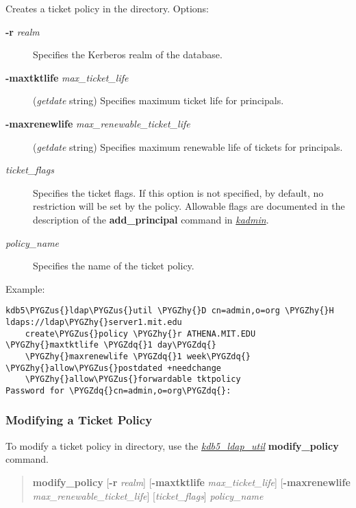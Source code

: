 \documentclass[letterpaper,10pt,english]{sphinxmanual}
\def\PYGZus{\char`\_}
\def\PYGZhy{\char`\-}
\def\PYGZdq{\char`\"}
\begin{document}
Creates a ticket policy in the directory.  Options:
\begin{description}
\item[{\textbf{-r} \emph{realm}}] \leavevmode
Specifies the Kerberos realm of the database.

\item[{\textbf{-maxtktlife} \emph{max\_ticket\_life}}] \leavevmode
(\emph{getdate} string) Specifies maximum ticket life for
principals.

\item[{\textbf{-maxrenewlife} \emph{max\_renewable\_ticket\_life}}] \leavevmode
(\emph{getdate} string) Specifies maximum renewable life of
tickets for principals.

\item[{\emph{ticket\_flags}}] \leavevmode
Specifies the ticket flags.  If this option is not specified, by
default, no restriction will be set by the policy.  Allowable
flags are documented in the description of the \textbf{add\_principal}
command in {\hyperref[admin/admin_commands/kadmin_local:kadmin-1]{\emph{kadmin}}}.

\item[{\emph{policy\_name}}] \leavevmode
Specifies the name of the ticket policy.

\end{description}

Example:

\begin{Verbatim}[commandchars=\\\{\}]
kdb5\PYGZus{}ldap\PYGZus{}util \PYGZhy{}D cn=admin,o=org \PYGZhy{}H ldaps://ldap\PYGZhy{}server1.mit.edu
    create\PYGZus{}policy \PYGZhy{}r ATHENA.MIT.EDU \PYGZhy{}maxtktlife \PYGZdq{}1 day\PYGZdq{}
    \PYGZhy{}maxrenewlife \PYGZdq{}1 week\PYGZdq{} \PYGZhy{}allow\PYGZus{}postdated +needchange
    \PYGZhy{}allow\PYGZus{}forwardable tktpolicy
Password for \PYGZdq{}cn=admin,o=org\PYGZdq{}:
\end{Verbatim}


\subsubsection{Modifying a Ticket Policy}
\label{admin/database:modifying-a-ticket-policy}
To modify a ticket policy in directory, use the
{\hyperref[admin/admin_commands/kdb5_ldap_util:kdb5-ldap-util-8]{\emph{kdb5\_ldap\_util}}} \textbf{modify\_policy} command.
\begin{quote}

\textbf{modify\_policy}
{[}\textbf{-r} \emph{realm}{]}
{[}\textbf{-maxtktlife} \emph{max\_ticket\_life}{]}
{[}\textbf{-maxrenewlife} \emph{max\_renewable\_ticket\_life}{]}
{[}\emph{ticket\_flags}{]}
\emph{policy\_name}
\end{quote}
\end{document}
